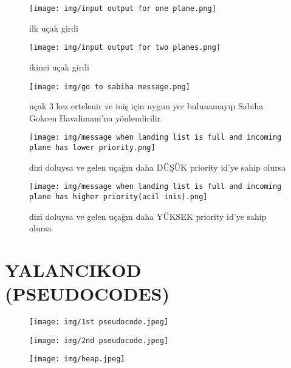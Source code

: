 \documentclass[conference]{IEEEtran}
\begin{document}
\begin{figure}[h]
    \centering
    \texttt{[image: img/input output for one plane.png]}
    \caption{ilk uçak girdi}
    \label{Şekil:3}
\end{figure}
\begin{figure}[h]
    \centering
    \texttt{[image: img/input output for two planes.png]}
    \caption{ikinci uçak girdi}
    \label{Şekil:4}
\end{figure}
\begin{figure}[h]
    \centering
    \texttt{[image: img/go to sabiha message.png]}
    \caption{uçak 3 kez ertelenir ve iniş için
   uygun yer bulunamayıp Sabiha Gokcen Havalimani'na yönlendirilir.}
    \label{Şekil:5}
\end{figure}
\begin{figure}[h]
    \centering
    \texttt{[image: img/message when landing list is full and incoming plane has lower priority.png]}
    \caption{dizi doluysa ve gelen uçağın daha DÜŞÜK priority id'ye sahip olursa}
    \label{Şekil:6}
\end{figure}
\begin{figure}[h]
    \centering
    \texttt{[image: img/message when landing list is full and incoming plane has higher priority(acil inis).png]}
    \caption{dizi doluysa ve gelen uçağın daha YÜKSEK priority id'ye sahip olursa}
    \label{Şekil:7}
\end{figure}



\newpage
\section*{\textbf{\LARGE YALANCIKOD (PSEUDOCODES)}}
\begin{figure}[h]
    \centering
    \texttt{[image: img/1st pseudocode.jpeg]}
\end{figure}
\begin{figure}[h]
    \centering
    \texttt{[image: img/2nd pseudocode.jpeg]}
\end{figure}
\begin{figure}[h]
    \centering
    \texttt{[image: img/heap.jpeg]}
\end{figure}
\\\\\\\\\\
\end{document}
